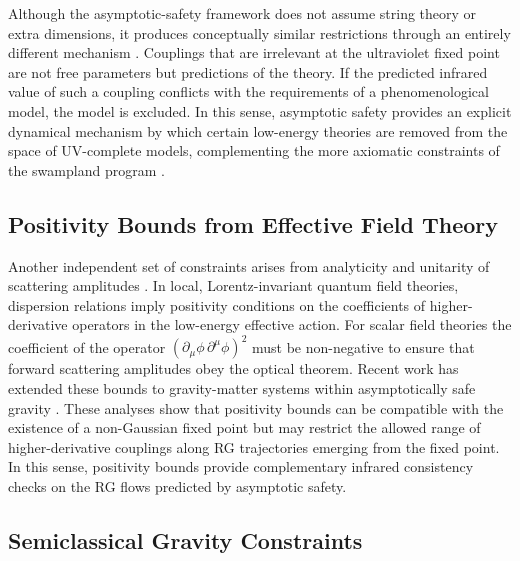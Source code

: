 \documentclass[12pt,a4paper]{article}
\begin{document}
Although the asymptotic-safety framework does not assume string theory or extra
dimensions, it produces conceptually similar restrictions through an entirely
different mechanism \cite{Eichhorn2019,BuoninfanteEtal2025}. Couplings that are
irrelevant at the ultraviolet fixed point are not free parameters but predictions
of the theory. If the predicted infrared value of such a coupling conflicts with
the requirements of a phenomenological model, the model is excluded. In this
sense, asymptotic safety provides an explicit dynamical mechanism by which
certain low-energy theories are removed from the space of UV-complete models,
complementing the more axiomatic constraints of the swampland program
\cite{EichhornHebeckerPawlowskiWalcher2024}.

\subsection{Positivity Bounds from Effective Field Theory}

Another independent set of constraints arises from analyticity and unitarity
of scattering amplitudes \cite{EichhornSchifferPedersen2025}. In local,
Lorentz-invariant quantum field theories, dispersion relations imply positivity
conditions on the coefficients of higher-derivative operators in the low-energy
effective action. For scalar field theories the coefficient of the operator
$(\partial_\mu\phi\,\partial^\mu\phi)^2$ must be non-negative to ensure that
forward scattering amplitudes obey the optical theorem. Recent work has extended
these bounds to gravity-matter systems within asymptotically safe gravity
\cite{EichhornSchifferPedersen2025}. These analyses show that positivity bounds
can be compatible with the existence of a non-Gaussian fixed point but may
restrict the allowed range of higher-derivative couplings along RG trajectories
emerging from the fixed point. In this sense, positivity bounds provide
complementary infrared consistency checks on the RG flows predicted by
asymptotic safety.

\subsection{Semiclassical Gravity Constraints}
\end{document}
